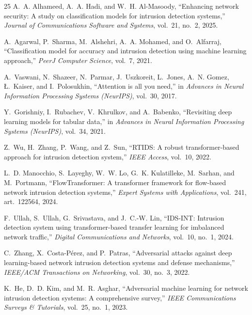 \begin{thebibliography}{25}
A.~A. Alhameed, A.~A. Hadi, and W.~H. Al-Masoody, ``Enhancing network security: A study on classification models for intrusion detection systems,'' \textit{Journal of Communications Software and Systems}, vol.~21, no.~2, 2025.

A.~Agarwal, P.~Sharma, M.~Alshehri, A.~A. Mohamed, and O.~Alfarraj, ``Classification model for accuracy and intrusion detection using machine learning approach,'' \textit{PeerJ Computer Science}, vol.~7, 2021.


A.~Vaswani, N.~Shazeer, N.~Parmar, J.~Uszkoreit, L.~Jones, A.~N. Gomez, {\L}.~Kaiser, and I.~Polosukhin, ``Attention is all you need,'' in \textit{Advances in Neural Information Processing Systems (NeurIPS)}, vol.~30, 2017.

Y.~Gorishniy, I.~Rubachev, V.~Khrulkov, and A.~Babenko, ``Revisiting deep learning models for tabular data,'' in \textit{Advances in Neural Information Processing Systems (NeurIPS)}, vol.~34, 2021.

Z.~Wu, H.~Zhang, P.~Wang, and Z.~Sun, ``RTIDS: A robust transformer-based approach for intrusion detection system,'' \textit{IEEE Access}, vol.~10, 2022.

L.~D. Manocchio, S.~Layeghy, W.~W. Lo, G.~K. Kulatilleke, M.~Sarhan, and M.~Portmann, ``FlowTransformer: A transformer framework for flow-based network intrusion detection systems,'' \textit{Expert Systems with Applications}, vol.~241, art.~122564, 2024.

F.~Ullah, S.~Ullah, G.~Srivastava, and J.~C.-W. Lin, ``IDS-INT: Intrusion detection system using transformer-based transfer learning for imbalanced network traffic,'' \textit{Digital Communications and Networks}, vol.~10, no.~1, 2024.

C.~Zhang, X.~Costa-P\'erez, and P.~Patras, ``Adversarial attacks against deep learning-based network intrusion detection systems and defense mechanisms,'' \textit{IEEE/ACM Transactions on Networking}, vol.~30, no.~3, 2022.


K.~He, D.~D. Kim, and M.~R. Asghar, ``Adversarial machine learning for network intrusion detection systems: A comprehensive survey,'' \textit{IEEE Communications Surveys \& Tutorials}, vol.~25, no.~1, 2023.


\end{thebibliography}
